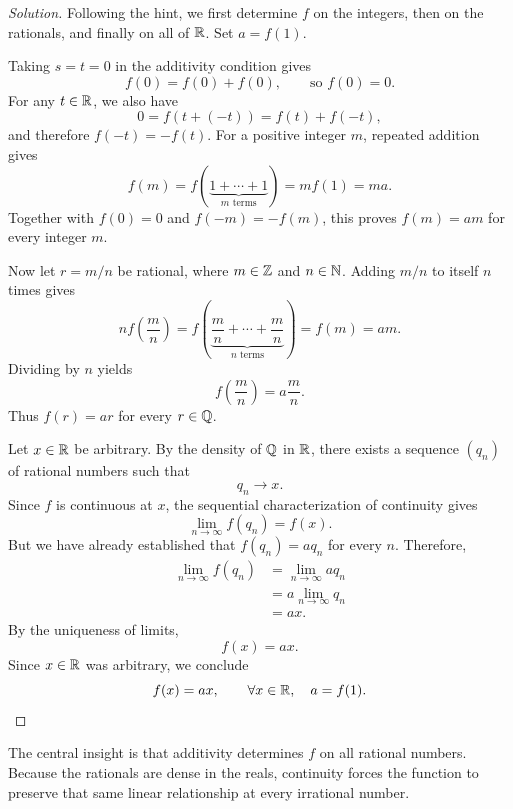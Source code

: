 \begin{proof}[Solution]
  Following the hint, we first determine $f$ on the integers, then on
  the rationals, and finally on all of $\mathbb{R}$. Set $a=f(1)$.

  Taking $s=t=0$ in the additivity condition gives
  \[
    f(0)=f(0)+f(0),\qquad\text{so }f(0)=0.
  \]
  For any $t\in\mathbb{R}$, we also have
  \[
    0=f(t+(-t))=f(t)+f(-t),
  \]
  and therefore $f(-t)=-f(t)$. For a positive integer $m$, repeated
  addition gives
  \[
    f(m)=f(\underbrace{1+\cdots+1}_{m\text{ terms}})
      =mf(1)=ma.
  \]
  Together with $f(0)=0$ and $f(-m)=-f(m)$, this proves $f(m)=am$
  for every integer $m$.

  Now let $r=m/n$ be rational, where $m\in\mathbb{Z}$ and $n\in\mathbb{N}$.
  Adding $m/n$ to itself $n$ times gives
  \[
    nf\left(\frac mn\right)
      =f\left(\underbrace{\frac mn+\cdots+\frac mn}_{n\text{ terms}}\right)
      =f(m)=am.
  \]
  Dividing by $n$ yields
  \[
    f\left(\frac mn\right)=a\frac mn.
  \]
  Thus $f(r)=ar$ for every $r\in\mathbb{Q}$.


  Let $x\in\mathbb{R}$ be arbitrary.
  By the density of $\mathbb{Q}$ in $\mathbb{R}$, there exists a sequence $(q_n)$
  of rational numbers such that
  \[
    q_n\longrightarrow x.
  \]
  Since $f$ is continuous at $x$, the sequential characterization of
  continuity gives
  \[
    \lim_{n\to\infty}f(q_n)=f(x).
  \]
  But we have already established that $f(q_n)=aq_n$ for every $n$.
  Therefore,
  \[
    \begin{aligned}
      \lim_{n\to\infty}f(q_n)
        &=\lim_{n\to\infty}aq_n\\
        &=a\lim_{n\to\infty}q_n\\
        &=ax.
    \end{aligned}
  \]
  By the uniqueness of limits,
  \[
    f(x)=ax.
  \]
  Since $x\in\mathbb{R}$ was arbitrary, we conclude
  \[
    f(x)=ax,\qquad\forall x\in\mathbb{R},\quad a=f(1).\qedhere
  \]

\end{proof}


The central insight is that additivity determines $f$ on all rational
numbers. Because the rationals are dense in the reals, continuity forces
the function to preserve that same linear relationship at every
irrational number.
